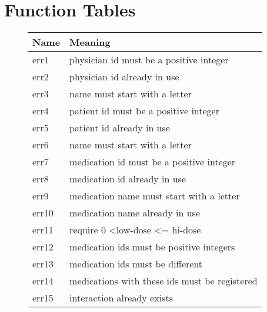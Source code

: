 

\section{Function Tables}


\begin{figure}[]
\begin{center}
\begin{tabular}{|l|l|}
\hline
Name  & Meaning                                                    \\ \hline
err1  & physician id must be a positive integer                    \\ \hline
err2  & physician id already in use                                \\ \hline
err3  & name must start with a letter                              \\ \hline
err4  & patient id must be a positive integer                      \\ \hline
err5  & patient id already in use                                  \\ \hline
err6  & name must start with a letter                              \\ \hline
err7  & medication id must be a positive integer                   \\ \hline
err8  & medication id already in use                               \\ \hline
err9  & medication name must start with a letter                   \\ \hline
err10 & medication name already in use                             \\ \hline
err11 & require 0 \textless low-dose \textless= hi-dose            \\ \hline
err12 & medication ids must be positive integers                   \\ \hline
err13 & medication ids must be different                           \\ \hline
err14 & medications with these ids must be registered              \\ \hline
err15 & interaction already exists                                 \\ \hline

\end{tabular}
\end{center}
\end{figure}
